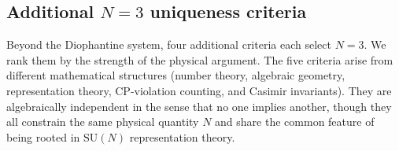 \documentclass[aps,prd,twocolumn,showpacs,preprintnumbers,superscriptaddress,floatfix]{revtex4-2}
\newcommand{\SU}{\mathrm{SU}}
\begin{document}
\subsection{Additional $N = 3$ uniqueness criteria}

Beyond the Diophantine system, four additional criteria each
select $N = 3$.
We rank them by the strength of the physical argument.
The five criteria arise from different mathematical structures
(number theory, algebraic geometry, representation theory,
CP-violation counting, and Casimir invariants).
They are algebraically independent in the sense that no one
implies another, though they all constrain the same physical
quantity $N$ and share the common feature of being rooted in
$\SU(N)$ representation theory.
\end{document}

